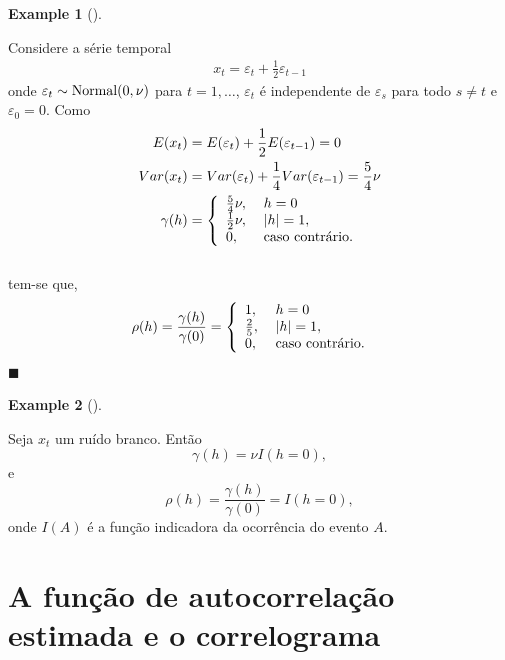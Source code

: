 \documentclass[
  letterpaper,
  DIV=11,
  numbers=noendperiod]{scrartcl}
\theoremstyle{definition}
\newtheorem{example}{Example}[chapter]
\theoremstyle{definition}
\theoremstyle{plain}
\theoremstyle{plain}
\theoremstyle{remark}
\begin{document}
\begin{example}[]\protect\hypertarget{exm-acf2}{}\label{exm-acf2}

Considere a série temporal \begin{align}
    x_t = \varepsilon_t +\frac{1}{2}\varepsilon_{t-1} \label{exer1}
    \end{align} onde \(\varepsilon_t\sim\hbox{Normal}(0,\nu)\) para
\(t=1,\ldots\), \(\varepsilon_t\) é independente de \(\varepsilon_s\)
para todo \(s\neq t\) e \(\varepsilon_0=0\). Como \begin{align}
    E(x_t)&=E(\varepsilon_t)+\frac{1}{2}E(\varepsilon_{t-1})=0\\
    Var(x_t)&=Var(\varepsilon_t)+\frac{1}{4}Var(\varepsilon_{t-1})=\frac{5}{4}\nu\\
    \gamma(h)&=\left\{ \begin{array}{ll}
    \frac{5}{4}\nu,&\; h = 0 \\       
    \frac{1}{2}\nu,&\; |h|=1,\\
    0,&\;\hbox{caso contrário.}
    \end{array} \right.
    \end{align}
\\
tem-se que, \begin{align}
    \rho(h)&=\frac{\gamma(h)}{\gamma(0)}=\left\{ \begin{array}{ll}
    1,&\; h = 0 \\        
    \frac{2}{5},&\; |h|=1,\\
    0,&\;\hbox{caso contrário.}
    \end{array} \right.
    \end{align} \(\blacksquare\)

\end{example}

\begin{example}[]\protect\hypertarget{exm-acf_ruido_branco}{}\label{exm-acf_ruido_branco}

Seja \(x_t\) um ruído branco. Então \[\gamma(h)=\nu I(h=0),\] e
\[\rho(h)=\frac{\gamma(h)}{\gamma(0)}=I(h=0),\] onde \(I(A)\) é a função
indicadora da ocorrência do evento \(A\).

\end{example}

\section{A função de autocorrelação estimada e o
correlograma}\label{a-funuxe7uxe3o-de-autocorrelauxe7uxe3o-estimada-e-o-correlograma}
\end{document}
